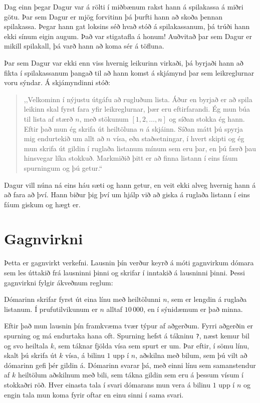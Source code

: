 
Dag einn þegar Dagur var á rölti í miðbænum rakst hann á spilakassa á miðri götu.
Þar sem Dagur er mjög forvitinn þá þurfti hann að skoða þennan spilakassa.
Þegar hann gat loksins séð hvað stóð á spilakassanum, þá trúði hann ekki sínum eigin augum.
Það var stigatafla á honum! Auðvitað þar sem Dagur er mikill spilakall, þá varð hann að koma sér á töfluna.

Þar sem Dagur var ekki enn viss hvernig leikurinn virkaði, þá byrjaði hann að fikta í spilakassanum
þangað til að hann komst á skjámynd þar sem leikreglurnar voru sýndar. Á skjámyndinni stóð:

\begin{quote}
,,Velkominn í nýjustu útgáfu að rugluðum lista. Áður en byrjað er að spila leikinn skal fyrst fara yfir leikreglurnar, þær eru eftirfarandi.
Ég mun búa til lista af stærð $n$, með stökunum $[1, 2, \dots, n]$ og síðan stokka ég hann.
Eftir það mun ég skrifa út heiltöluna $n$ á skjáinn. Síðan mátt þú spyrja mig endurtekið um allt að $n$ vísa, eða staðsetningar, í hvert skipti
og ég mun skrifa út gildin í ruglaða listanum mínum sem eru þar, en þú færð þau hinsvegar líka stokkuð.
Markmiðið þitt er að finna listann í eins fáum spurningum og þú getur.``
\end{quote}

Dagur vill núna ná eins háu sæti og hann getur, en veit ekki alveg hvernig hann á að fara að því.
Hann biður þig því um hjálp við að giska á ruglaða listann í eins fáum giskum og hægt er.

\section*{Gagnvirkni}
Þetta er gagnvirkt verkefni. Lausnin þín verður keyrð á móti gagnvirkum dómara
sem les úttakið frá lausninni þinni og skrifar í inntakið á lausninni þinni.
Þessi gagnvirkni fylgir ákveðnum reglum:

Dómarinn skrifar fyrst út eina línu með heiltölunni $n$, sem er lengdin á ruglaða listanum.
Í prufutilvikunum er $n$ alltaf $10\,000$, en í sýnidæmum er það minna.

Eftir það mun lausnin þín framkvæma tvær týpur af aðgerðum.
Fyrri aðgerðin er spurning og má endurtaka hana oft.
Spurning hefst á tákninu \texttt{?}, næst kemur bil og svo heiltala $k$, sem táknar
fjölda vísa sem spurt er um. Þar eftir, í sömu línu, skalt þú skrifa út $k$ vísa, á bilinu $1$ upp í $n$,
aðskilna með bilum, sem þú vilt að dómarinn gefi þér gildin á.
Dómarinn svarar þá, með einni línu sem samanstendur af $k$ heiltölum aðskilnum
með bili, sem tákna gildin sem eru á þessum vísum í stokkaðri röð. Hver einasta tala í svari dómarans
mun vera á bilinu $1$ upp í $n$ og engin tala mun koma fyrir oftar en einu sinni í sama svari.

